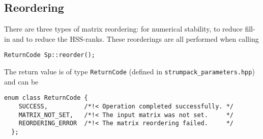 \documentclass{article}
\begin{document}
\subsection{Reordering}
There are three types of matrix reordering: for numerical stability,
to reduce fill-in and to reduce the HSS-ranks. These reorderings are
all performed when calling
\begin{lstlisting}[style=C]
  ReturnCode Sp::reorder();
\end{lstlisting}
The return value is of type \lstinline[style=C]!ReturnCode!  (defined
in \lstinline[style=Bash]!strumpack_parameters.hpp!) and can be
\begin{lstlisting}[style=C]
  enum class ReturnCode {
    SUCCESS,          /*!< Operation completed successfully. */
    MATRIX_NOT_SET,   /*!< The input matrix was not set.     */
    REORDERING_ERROR  /*!< The matrix reordering failed.     */
  };
\end{lstlisting}
\end{document}
